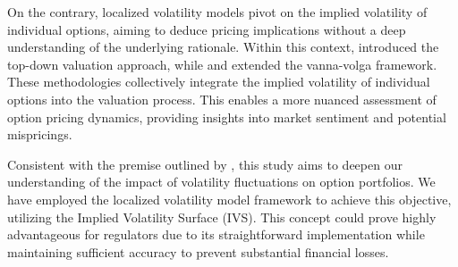 On the contrary, localized volatility models pivot on the implied volatility of individual options, aiming to deduce pricing implications without a deep understanding of the underlying rationale. Within this context, \cite{carr2020option} introduced the top-down valuation approach, while \cite{arslan2009gamma} and \cite{gershon2018model} extended the vanna-volga framework. These methodologies collectively integrate the implied volatility of individual options into the valuation process. This enables a more nuanced assessment of option pricing dynamics, providing insights into market sentiment and potential mispricings.

Consistent with the premise outlined by \cite{carr2020option}, this study aims to deepen our understanding of the impact of volatility fluctuations on option portfolios. We have employed the localized volatility model framework to achieve this objective, utilizing the Implied Volatility Surface (IVS). This concept could prove highly advantageous for regulators due to its straightforward implementation while maintaining sufficient accuracy to prevent substantial financial losses.

